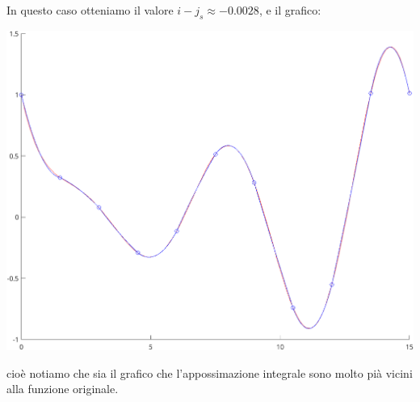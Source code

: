 \documentclass[a4paper,11pt]{article}
\begin{document}
\newpage
In questo caso otteniamo il valore $i - j_s \approx -0.0028$, e il grafico:
\begin{center}
	\includegraphics{../figures/matlab_simpson_int.png}
\end{center}
cioè notiamo che sia il grafico che l'appossimazione integrale sono molto pià vicini alla funzione originale.
\end{document}

